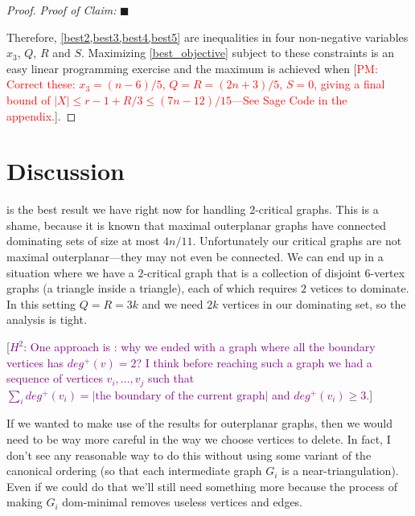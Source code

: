 \documentclass[12pt]{article}
\newenvironment{clmproof}{\noindent\emph{Proof of Claim:}}{\hfill{$\blacksquare$}\par}
\theoremstyle{definition}
\newcommand{\pat}[1]{[\textcolor{red}{PM: #1}]}
\newcommand{\hussein}[1]{[\textcolor{purple}{$H^2$: #1}]}
\begin{document}
\begin{proof}
\begin{clmproof}
  \end{clmproof}
  Therefore, \cref{best2,best3,best4,best5} are inequalities in four non-negative variables $x_3$, $Q$, $R$ and $S$.  Maximizing \cref{best_objective} subject to these constraints is an easy linear programming exercise and the maximum is achieved when \pat{Correct these: $x_3=(n-6)/5$, $Q=R=(2n+3)/5$, $S=0$, giving a final bound of $|X|\le r-1+R/3\le (7n-12)/15$---See Sage Code in the appendix.}.
\end{proof}





\section{Discussion}

 is the best result we have right now for handling $2$-critical graphs.  This is a shame, because it is known that maximal outerplanar graphs have connected dominating sets of size at most $4n/11$. Unfortunately our critical graphs are not maximal outerplanar---they may not even be connected.  We can end up in a situation where we have a $2$-critical graph that is a collection of disjoint $6$-vertex graphs (a triangle inside a triangle), each of which requires $2$ vetices to dominate.  In this setting $Q=R=3k$ and we need $2k$ vertices in our dominating set, so the analysis is tight.

\hussein{One approach is : why we ended with a graph where all the boundary vertices has $deg^+(v) = 2$? I think before reaching such a graph we had a sequence of vertices $v_i,...,v_j$  such that $\sum_i deg^+(v_i) = |\text{the boundary of the current graph}|$ and $deg^+(v_i) \geq 3$.}

If we wanted to make use of the results for outerplanar graphs, then we would need to be way more careful in the way we choose vertices to delete.  In fact, I don't see any reasonable way to do this without using some variant of the canonical ordering (so that each intermediate graph $G_i$ is a near-triangulation).  Even if we could do that we'll still need something more because the process of making $G_i$ dom-minimal removes useless vertices and edges.

\end{document}
